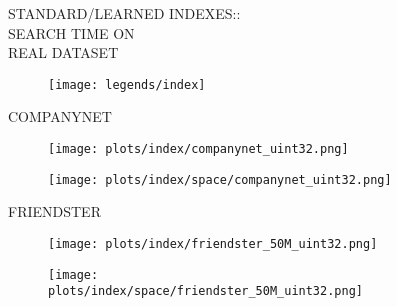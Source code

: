 \documentclass{article}
\begin{document}
\begin{figure}[!htbp]
\fbox
{
\begin{minipage}[t][0.98\textheight][t]{\textwidth}
\centering
\vspace*{-0.2cm}
    \begin{minipage}{0.23\linewidth}
    \footnotesize{STANDARD/LEARNED INDEXES::\\SEARCH TIME ON \\ REAL DATASET}
    \end{minipage}
   \begin{minipage}{0.75\linewidth}
        \begin{figure}[H]
        \texttt{[image: legends/index]}
        \end{figure}
    \end{minipage}
    \vspace*{-10px}

    \begin{minipage}{0.05\linewidth}
    \begin{sideways}\small COMPANYNET\end{sideways}
    \end{minipage}
    \begin{minipage}{0.3\linewidth}
        \begin{figure}[H]
        \texttt{[image: plots/index/companynet\_uint32.png]}
        \end{figure}
    \end{minipage}
    \begin{minipage}{0.3\linewidth}
        \begin{figure}[H]
            \texttt{[image: plots/index/space/companynet\_uint32.png]}
        \end{figure}
    \end{minipage}
    \vspace*{-20px}

    \begin{minipage}{0.05\linewidth}
    \begin{sideways}\small FRIENDSTER\end{sideways}
    \end{minipage}
    \begin{minipage}{0.3\linewidth}
        \begin{figure}[H]
        \texttt{[image: plots/index/friendster\_50M\_uint32.png]}
        \end{figure}
    \end{minipage}
    \begin{minipage}{0.3\linewidth}
        \begin{figure}[H]
            \texttt{[image: plots/index/space/friendster\_50M\_uint32.png]}
        \end{figure}
    \end{minipage}
    \vspace*{-20px}


\end{minipage}}
\end{figure}
\end{document}
